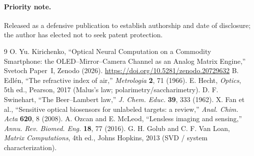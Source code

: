 \documentclass[11pt]{article}
\begin{document}
\paragraph{Priority note.} Released as a defensive publication to establish authorship and date
of disclosure; the author has elected not to seek patent protection.

\begin{thebibliography}{9}\small
{} O. Yu. Kirichenko, ``Optical Neural Computation on a Commodity Smartphone: the OLED--Mirror--Camera Channel as an Analog Matrix Engine,'' Svetoch Paper~I, Zenodo (2026). \url{https://doi.org/10.5281/zenodo.20729632}
 B. Edl\'en, ``The refractive index of air,'' \emph{Metrologia} \textbf{2}, 71 (1966).
 E. Hecht, \emph{Optics}, 5th ed., Pearson, 2017 (Malus's law; polarimetry/saccharimetry).
 D. F. Swinehart, ``The Beer--Lambert law,'' \emph{J. Chem. Educ.} \textbf{39}, 333 (1962).
 X. Fan et al., ``Sensitive optical biosensors for unlabeled targets: a review,'' \emph{Anal. Chim. Acta} \textbf{620}, 8 (2008).
 A. Ozcan and E. McLeod, ``Lensless imaging and sensing,'' \emph{Annu. Rev. Biomed. Eng.} \textbf{18}, 77 (2016).
 G. H. Golub and C. F. Van Loan, \emph{Matrix Computations}, 4th ed., Johns Hopkins, 2013 (SVD / system characterization).
\end{thebibliography}

\svetochfooter
\end{document}
